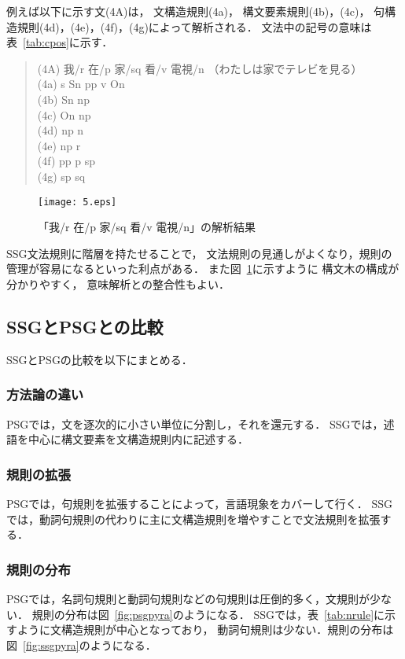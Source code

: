 \documentclass[japanese]{jnlp_1.3a}
\begin{document}
例えば以下に示す文(4A)は，
文構造規則(4a)，
構文要素規則(4b)，(4c)，
句構造規則(4d)，(4e)，(4f)，(4g)によって解析される．
文法中の記号の意味は表~\ref{tab:cpos}に示す．
\begin{quotation}\noindent
\文(4A) 我/r 在/p 家/sq 看/v 電視/n （わたしは家でテレビを見る）\\
(4a) s \ya Sn pp v On\\
(4b) Sn \ya np\\
(4c) On \ya np\\
(4d) np \ya n\\
(4e) np \ya r\\
(4f) pp \ya p sp\\
(4g) sp \ya sq
\end{quotation}

\begin{figure}[t]
  \begin{center}
       \texttt{[image: 5.eps]}
    \caption{「我/r 在/p 家/sq 看/v 電視/n」の解析結果}
    \label{fig:wotv}
  \end{center}
\end{figure}

SSG文法規則に階層を持たせることで，
文法規則の見通しがよくなり，規則の管理が容易になるといった利点がある．
また図~\ref{fig:wotv}に示すように
構文木の構成が分かりやすく，
意味解析との整合性もよい．

\subsection{SSGとPSGとの比較}
SSGとPSGの比較を以下にまとめる．

\subsubsection{方法論の違い}
PSGでは，文を逐次的に小さい単位に分割し，それを還元する．
SSGでは，述語を中心に構文要素を文構造規則内に記述する．

\subsubsection{規則の拡張}
PSGでは，句規則を拡張することによって，言語現象をカバーして行く．
SSGでは，動詞句規則の代わりに主に文構造規則を増やすことで文法規則を拡張する．

\subsubsection{規則の分布}
PSGでは，名詞句規則と動詞句規則などの句規則は圧倒的多く，文規則が少ない．
規則の分布は図~\ref{fig:psgpyra}のようになる．
SSGでは，表~\ref{tab:nrule}に示すように文構造規則が中心となっており，
動詞句規則は少ない．規則の分布は図~\ref{fig:ssgpyra}のようになる．
\end{document}
